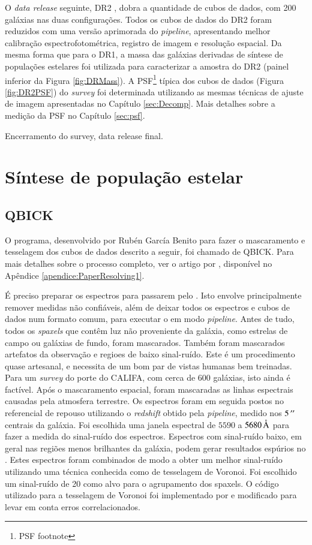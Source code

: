 O {\em data release} seguinte, DR2 \citep{GarciaBenito2015}, dobra a quantidade
de cubos de dados, com 200 galáxias nas duas configurações. Todos os cubos de
dados do DR2 foram reduzidos com uma versão aprimorada do {\em pipeline}\fixme,
apresentando melhor calibração espectrofotométrica\fixme, registro de imagem e
resolução espacial. Da mesma forma que para o DR1, a massa das galáxias
derivadas de síntese de populações estelares foi utilizada para caracterizar a
amostra do DR2 (painel inferior da Figura \ref{fig:DRMass}). A
PSF\footnote{\TODO PSF footnote} típica dos cubos de dados (Figura
\ref{fig:DR2PSF}) do {\em survey} foi determinada utilizando as mesmas técnicas
de ajuste de imagem apresentadas no Capítulo \ref{sec:Decomp}. Mais detalhes
sobre a medição da PSF no Capítulo \ref{sec:psf}.

\TODO Encerramento do survey, data release final.

\section{Síntese de população estelar}

\subsection{QBICK}

O programa, desenvolvido por Rubén García Benito para fazer o mascaramento e
tesselagem dos cubos de dados descrito a seguir, foi chamado de QBICK. Para mais
detalhes sobre o processo completo, ver o artigo por \citet{CidFernandes2013},
disponível no Apêndice \ref{apendice:PaperResolving1}.

É preciso preparar os espectros para passarem pelo \starlight. Isto envolve
principalmente remover medidas não confiáveis, além de deixar todos os espectros
e cubos de dados num formato comum, para executar o \starlight em modo {\em
pipeline}. Antes de tudo, todos os {\em spaxels} que contêm luz não proveniente
da galáxia, como estrelas de campo ou galáxias de fundo, foram mascarados.
Também foram mascarados artefatos da observação e regioes de baixo sinal-ruído.
Este é um procedimento quase artesanal, e necessita de um bom par de vistas
humanas bem treinadas. Para um {\em survey} do porte do CALIFA, com cerca de 600
galáxias, isto ainda é factível. Após o mascaramento espacial, foram mascaradas
as linhas espectrais causadas pela atmosfera terrestre. Os espectros foram em
seguida postos no referencial de repouso utilizando o {\em redshift} obtido pela
{\em pipeline}, medido nos $5\,^{\prime\prime}$ centrais da galáxia. Foi escolhida uma
janela espectral de $5590$ a $5680\,\text{\normalfont\AA}$ para fazer a medida do
sinal-ruído dos espectros. Espectros com sinal-ruído baixo, em geral nas regiões
menos brilhantes da galáxia, podem gerar resultados espúrios no \starlight.
Estes espectros foram combinados de modo a obter um melhor sinal-ruído
utilizando uma técnica conhecida como de tesselagem de Voronoi. Foi escolhido um
sinal-ruído de 20 como alvo para o agrupamento dos spaxels. O código utilizado
para a tesselagem de Voronoi foi implementado por \citet{Cappellari2003} e
modificado para levar em conta erros correlacionados.

